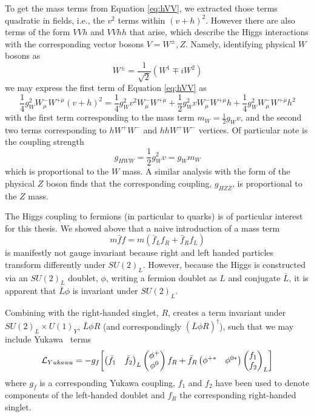 To get the mass terms from Equation \ref{eq:hVV}, we extracted those terms quadratic in fields, i.e., the
$v^2$ terms within $(v+h)^2$. However there are also terms of the form $VVh$ and $VVhh$ that arise, which 
describe the Higgs interactions with the corresponding vector bosons $V = W^{\pm}, Z$. Namely, identifying 
physical $W$ bosons as
\begin{equation}
W^{\pm} = \frac{1}{\sqrt{2}}(W^1\mp iW^2)
\end{equation}
we may express the first term of Equation \ref{eq:hVV} as 
\begin{equation}
\frac{1}{4}g_{W}^2W^{-}_{\mu}W^{+ \mu}(v+h)^2 = 
\frac{1}{4}g_{W}^2v^2W^{-}_{\mu}W^{+ \mu}+\frac{1}{2}g_{W}^2vW^{-}_{\mu}W^{+ \mu}h + 
\frac{1}{4}g_{W}^2W^{-}_{\mu}W^{+ \mu}h^2
\end{equation}
with the first term corresponding to the mass term $m_{W} = \frac{1}{2}g_{W}v$, and 
the second two terms corresponding to $hW^{+}W^{-}$ and $hhW^{+}W^{-}$ vertices. Of particular 
note is the coupling strength
\begin{equation}
g_{HWW} = \frac{1}{2}g_{W}^2v = g_{W}m_{W}
\end{equation}
which is proportional to the $W$ mass. A similar analysis with the form of the 
physical $Z$ boson finds that the corresponding coupling, $g_{HZZ}$, is proportional to the $Z$ 
mass.

The Higgs coupling to fermions (in particular to quarks) is of particular interest for this thesis. 
We showed above that a naive introduction of a mass term 
\begin{equation}
m\bar{f}f = m(\bar{f}_{L}f_{R} + \bar{f}_Rf_{L})
\end{equation}
is manifestly not gauge invariant because right and left handed particles transform differently 
under $SU(2)_L$. However, because the Higgs is constructed via an $SU(2)_L$ doublet, $\phi$, 
writing a fermion doublet as $L$ and conjugate $\bar{L}$, it is apparent that $\bar{L}\phi$ is 
invariant under $SU(2)_L$. 

Combining with the right-handed singlet, $R$, creates a term invariant under $SU(2)_{L} \times U(1)_{Y}$, 
$\bar{L}\phi R$ (and correspondingly $(\bar{L}\phi R)^{\dagger}$), such that we may include Yukawa~\cite{Yukawa-lep}
terms
\begin{equation}
\mathcal{L}_{Yukawa} = -g_{f}\qty[\begin{pmatrix}\bar{f}_{1} &\bar{f}_2\end{pmatrix}_L 
\begin{pmatrix}\phi^{+}\\\phi^{0}\end{pmatrix}f_R +
\bar{f}_R\begin{pmatrix}\phi^{+*} & \phi^{0*}\end{pmatrix}\begin{pmatrix}f_{1} \\f_2\end{pmatrix}_L]
\end{equation}
where $g_{f}$ is a corresponding Yukawa coupling, $f_{1}$ and $f_{2}$ have been used to denote 
components of the left-handed doublet and $f_{R}$ the corresponding right-handed singlet.


